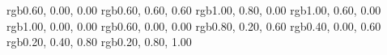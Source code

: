%
%
%
\RequirePackage{xcolor}
%
       {rgb}{0.60, 0.00, 0.00} %
      {rgb}{0.60, 0.60, 0.60} %
% 
    {rgb}{1.00, 0.80, 0.00} %
    {rgb}{1.00, 0.60, 0.00} %
  {rgb}{1.00, 0.00, 0.00} %
     {rgb}{0.60, 0.00, 0.00} %
    {rgb}{0.80, 0.20, 0.60} %
    {rgb}{0.40, 0.00, 0.60} %
  {rgb}{0.20, 0.40, 0.80} %
 {rgb}{0.20, 0.80, 1.00} %
